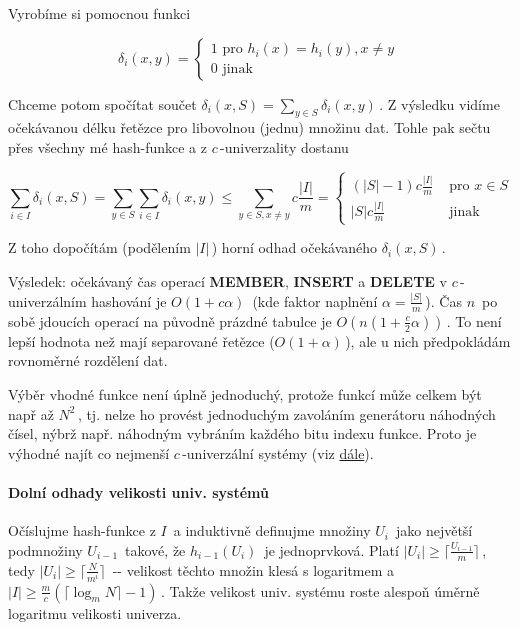 Vyrobíme si pomocnou funkci

\[\delta_i(x,y)= \begin{cases}1 \mbox{ pro } h_i(x)=h_i(y), x\neq y \\ 0 \mbox{ jinak }\end{cases}\,\!\]

Chceme potom spočítat součet
\(\delta_i(x,S)=\sum_{y\in S}\delta_i(x,y)\,\!\). Z výsledku vidíme
očekávanou délku řetězce pro libovolnou (jednu) množinu dat. Tohle pak
sečtu přes všechny mé hash-funkce a z \(c\,\!\)-univerzality dostanu

\[\sum_{i\in I}\delta_i(x,S)=\sum_{y\in S}\sum_{i\in I}\delta_i(x,y) \leq \sum_{y\in S,x\neq y} c\frac{|I|}{m} = \begin{cases} (|S|-1)c\frac{|I|}{m} & \mbox{ pro } x\in S \\ |S|c\frac{|I|}{m} & \mbox{ jinak }  \end{cases}\,\!\]

Z toho dopočítám (podělením \(|I|\,\!\)) horní odhad očekávaného
\(\delta_i(x,S)\,\!\).

Výsledek: očekávaný čas operací \textbf{MEMBER}, \textbf{INSERT} a
\textbf{DELETE} v \(c\,\!\)-univerzálním hashování je
\(O(1+c\alpha)\,\!\) (kde faktor naplnění \(\alpha=\frac{|S|}{m}\,\!\)).
Čas \(n\,\!\) po sobě jdoucích operací na původně prázdné tabulce je
\(O(n(1+\frac{c}{2}\alpha))\,\!\). To není lepší hodnota než mají
separované řetězce (\(O(1+\alpha)\,\!\)), ale u nich předpokládám
rovnoměrné rozdělení dat.

Výběr vhodné funkce není úplně jednoduchý, protože funkcí může celkem
být např až \(N^2\,\!\), tj. nelze ho provést jednoduchým zavoláním
generátoru náhodných čísel, nýbrž např. náhodným vybráním každého bitu
indexu funkce. Proto je výhodné najít co nejmenší \(c\,\!\)-univerzální
systémy (viz
\protect\hyperlink{Dolnuxed_odhady_velikosti_univerzuxe1lnuxedch_systuxe9mux16f}{dále}).

\paragraph{Dolní odhady velikosti univ.
systémů}\label{dolnuxed-odhady-velikosti-univ.-systuxe9mux16f}

Očíslujme hash-funkce z \(I\,\!\) a induktivně definujme množiny
\(U_i\,\!\) jako největší podmnožiny \(U_{i-1}\,\!\) takové, že
\(h_{i-1}(U_i)\,\!\) je jednoprvková. Platí
\(|U_i|\geq \lceil \frac{U_{i-1}}{m}\rceil\,\!\), tedy
\(|U_i|\geq\lceil\frac{N}{m^i}\rceil\,\!\) -\/- velikost těchto množin
klesá s logaritmem a
\(|I|\geq \frac{m}{c}(\lceil\log_m N\rceil -1)\,\!\). Takže velikost
univ. systému roste alespoň úměrně logaritmu velikosti univerza.

